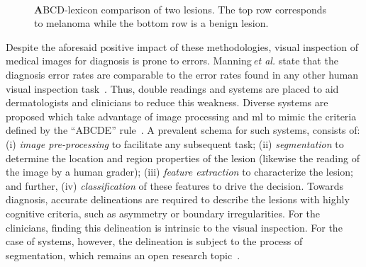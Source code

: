 \begin{figure}
\begin{center}
    \hfill
    \hfill
    \hfill
  \hspace*{\fill}\\
    \caption{{\textbf ABCD}-lexicon comparison of two lesions. The top row corresponds to melanoma while the bottom row is a benign lesion.}
  \label{fig:lexicon}
\end{center}
\end{figure}
%

Despite the aforesaid positive impact of these methodologies, visual inspection of medical images for diagnosis is prone to errors.
Manning\,\emph{et al.} state that the diagnosis error rates are comparable to the error rates found in any other human visual inspection task~\cite{manning2014perception}.
Thus, double readings and \cad systems are placed to aid dermatologists and clinicians to reduce this weakness.
Diverse \cad systems are proposed which take advantage of image processing and \ac{ml} to mimic the criteria defined by the ``ABCDE'' rule~\cite{rastgoo2015automatic}.
A prevalent schema for such \cad systems, consists of: (i) \textit{image pre-processing} to facilitate any subsequent task; (ii) \textit{segmentation} to determine the location and region properties of the lesion (likewise the reading of the image by a human grader); (iii) \textit{feature extraction} to characterize the lesion; and further, (iv) \textit{classification} of these features to drive the decision.
Towards diagnosis, accurate delineations are required to describe the lesions with highly cognitive criteria, such as asymmetry or boundary irregularities.
For the clinicians, finding this delineation is intrinsic to the visual inspection. 
For the case of \cad systems, however, the delineation is subject to the process of segmentation, which remains an open research topic~\cite{duncan2000medical}.

